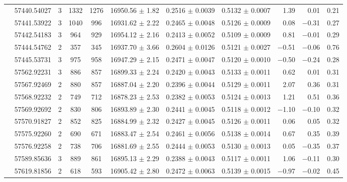 \documentclass[a4paper,fleqn,usenatbib]{mnras}
\begin{document}
\begin{table*}
\begin{threeparttable}
{\begin{tabular}{c c c c c c c c r r c}
 & 57440.54027  & 3 & 1332 & 1276 & 16950.56 $\pm$ 1.82  &   0.2516 $\pm$ 0.0039  &   0.5132 $\pm$ 0.0007  &     1.39  &     0.01   &  0.21\\  
 & 57441.53922  & 3 & 1040 & 996 & 16931.62 $\pm$ 2.22  &   0.2465 $\pm$ 0.0048  &   0.5126 $\pm$ 0.0009  &     0.08  &   $-$0.31    & 0.27\\   
 & 57442.54183  & 3 &  964 &  929 & 16954.12 $\pm$ 2.16  &   0.2413 $\pm$ 0.0052  &   0.5109 $\pm$ 0.0009  &     0.81  &   $-$0.01    &  0.29\\   
 & 57444.54762  & 2 &  357 &  345 & 16937.70 $\pm$ 3.66  &   0.2604 $\pm$ 0.0126  &   0.5121 $\pm$ 0.0027  &$-$0.51  &   $-$0.06    & 0.76\\  
 & 57445.53731  & 3 &  975 &  958 & 16947.29 $\pm$ 2.15  &   0.2471 $\pm$ 0.0047  &   0.5120 $\pm$ 0.0010  &$-$0.50  &   $-$0.24    & 0.28\\[3pt]  
\parbox[t]{1mm}{} & 57562.92231 & 3 & 886 & 857 & 16899.33 $\pm$ 2.24  &   0.2420 $\pm$ 0.0043  &   0.5133 $\pm$ 0.0011  &     0.62  & 0.01 & 0.31\\  
 & 57567.92469  & 2 & 880 & 857 & 16887.04 $\pm$ 2.20  &   0.2396 $\pm$ 0.0044  &   0.5129 $\pm$ 0.0011  &     2.07  &    0.36    &  0.31\\   
 & 57568.92232  & 2 & 749 & 712 & 16878.23 $\pm$ 2.53  &   0.2382 $\pm$ 0.0053  &   0.5124 $\pm$ 0.0013  &     1.21  &    0.51   &  0.36\\  
 & 57569.92692  & 2 & 830 & 806 & 16893.89 $\pm$ 2.30  &   0.2441 $\pm$ 0.0045  &   0.5118 $\pm$ 0.0012  &$-$1.10  &   $-$0.10   &  0.32\\  
 & 57570.91827  & 2 & 852 & 825 & 16884.99 $\pm$ 2.32  &   0.2427 $\pm$ 0.0045  &   0.5126 $\pm$ 0.0011  &     0.06  &    0.05   &  0.32\\  
 & 57575.92260  & 2 & 690 & 671 & 16883.47 $\pm$ 2.54  &   0.2461 $\pm$ 0.0056  &   0.5138 $\pm$ 0.0014  &     0.67  &   0.35    &  0.39\\  
 & 57576.92258  & 2 & 738 & 706 & 16881.69 $\pm$ 2.55  &   0.2444 $\pm$ 0.0053  &   0.5130 $\pm$ 0.0013  &     0.05  &  $-$0.35    &  0.37\\   
 & 57589.85636  & 3 & 889 & 861 & 16895.13 $\pm$ 2.29  &   0.2388 $\pm$ 0.0043  &   0.5117 $\pm$ 0.0011   &    1.06  &   $-$0.11    &  0.30\\[3pt]  
\parbox[t]{1mm}{} & 57619.81856  & 2 & 618 & 593 & 16905.42 $\pm$ 2.80  &   0.2472 $\pm$ 0.0063  &   0.5139 $\pm$ 0.0015  &$-$0.97  &  $-$0.02 & 0.45\\  

\end{tabular}}
\end{threeparttable}
\end{table*}
\end{document}
